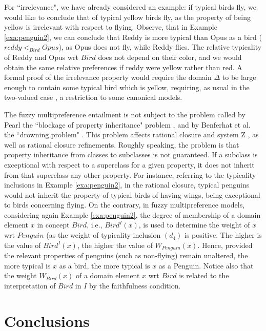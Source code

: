 \documentclass[runningheads]{llncs}
\begin{document}
For ``irrelevance", we have already considered an example: if typical birds fly, we would like to conclude that  of  typical yellow birds fly, as the property of being yellow is irrelevant with respect to flying. Observe, that in Example  \ref{exa:penguin2}, we can conclude that Reddy is more typical than Opus  as a bird ($\mathit{reddy <_{Bird} Opus}$), as Opus does not fly, while Reddy flies. The relative typicality of Reddy and Opus wrt $\mathit{Bird}$ does not depend on their color, and we would obtain the same relative preferences if reddy were yellow rather than red. A formal proof of the irrelevance property would require the domain $\Delta$ to be large enough to contain some typical bird which is yellow, requiring, as usual in the two-valued case \cite{AIJ15}, a restriction to some canonical models.

The  fuzzy multipreference entailment is not subject to the problem called by Pearl  the ``blockage of property inheritance" problem  \cite{Pearl90},
and by Benferhat et al. the ``drowning problem"  \cite{BenferhatIJCAI93}. This problem affects rational closure and system Z \cite{Pearl90}, as well as  rational closure refinements. Roughly speaking, the problem is that property inheritance from classes to subclasses is not guaranteed.
If a subclass is exceptional with respect to a superclass for a given property, 
it does not inherit from that superclass any other property. 
For instance, referring to the typicality inclusions in Example \ref{exa:penguin2}, in the rational closure, typical penguins would not inherit the property of typical birds of having wings, being exceptional to birds concerning flying.
On the contrary,
in  fuzzy multipreference models, 
considering again Example \ref{exa:penguin2}, the degree of membership of a domain element $x$ in concept $\mathit{Bird}$, i.e., $\mathit{Bird^I(x)}$, is used to determine the weight of $x$ wrt $\mathit{Penguin}$ (as the weight of typicality inclusion $(d_4)$ is positive. The higher is the value of $\mathit{Bird^I(x)}$, the higher the value of  $\mathit{W_{Penguin}(x)}$.  Hence, provided the relevant properties of penguins (such as non-flying) remain unaltered, the more typical is $x$ as a bird, 
the more typical is $x$ as a Penguin.
Notice also that the weight $\mathit{W_{Bird}(x)}$ of a domain element $x$ wrt $\mathit{Bird}$ is related to the interpretation of $Bird$ in $I$ by the faithfulness condition.

\section{Conclusions}
\end{document}
